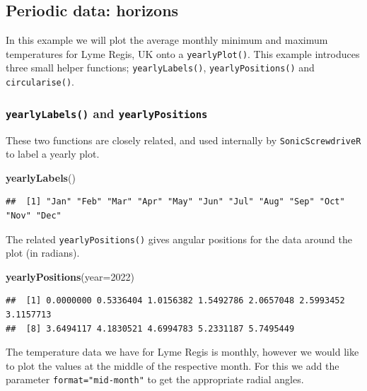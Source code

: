 \documentclass[
]{book}
\newenvironment{Shaded}{\begin{snugshade}}{\end{snugshade}}
\newcommand{\AttributeTok}[1]{\textcolor[rgb]{0.13,0.29,0.53}{#1}}
\newcommand{\DecValTok}[1]{\textcolor[rgb]{0.00,0.00,0.81}{#1}}
\newcommand{\FunctionTok}[1]{\textcolor[rgb]{0.13,0.29,0.53}{\textbf{#1}}}
\newcommand{\NormalTok}[1]{#1}
\begin{document}
\hypertarget{periodic-data-horizons}{%
\subsection{Periodic data: horizons}\label{periodic-data-horizons}}

In this example we will plot the average monthly minimum and maximum temperatures for Lyme Regis, UK onto a \texttt{yearlyPlot()}. This example introduces three small helper functions; \texttt{yearlyLabels()}, \texttt{yearlyPositions()} and \texttt{circularise()}.

\hypertarget{yearlylabels-and-yearlypositions}{%
\subsubsection{\texorpdfstring{\texttt{yearlyLabels()} and \texttt{yearlyPositions}}{yearlyLabels() and yearlyPositions}}\label{yearlylabels-and-yearlypositions}}

These two functions are closely related, and used internally by \texttt{SonicScrewdriveR} to label a yearly plot.

\begin{Shaded}
\begin{Highlighting}[]
\FunctionTok{yearlyLabels}\NormalTok{()}
\end{Highlighting}
\end{Shaded}

\begin{verbatim}
##  [1] "Jan" "Feb" "Mar" "Apr" "May" "Jun" "Jul" "Aug" "Sep" "Oct" "Nov" "Dec"
\end{verbatim}

The related \texttt{yearlyPositions()} gives angular positions for the data around the plot (in radians).

\begin{Shaded}
\begin{Highlighting}[]
\FunctionTok{yearlyPositions}\NormalTok{(}\AttributeTok{year=}\DecValTok{2022}\NormalTok{)}
\end{Highlighting}
\end{Shaded}

\begin{verbatim}
##  [1] 0.0000000 0.5336404 1.0156382 1.5492786 2.0657048 2.5993452 3.1157713
##  [8] 3.6494117 4.1830521 4.6994783 5.2331187 5.7495449
\end{verbatim}

The temperature data we have for Lyme Regis is monthly, however we would like to plot the values at the middle of the respective month. For this we add the parameter \texttt{format="mid-month"} to get the appropriate radial angles.
\end{document}
